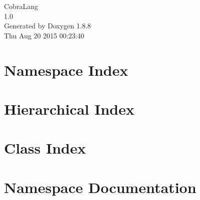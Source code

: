 \documentclass[twoside]{book}
\newcommand{\+}{\discretionary{\mbox{\scriptsize$\hookleftarrow$}}{}{}}
\newcommand{\clearemptydoublepage}{%
  \newpage{\pagestyle{empty}\cleardoublepage}%
}
\begin{document}
\hypersetup{pageanchor=false,
             bookmarks=true,
             bookmarksnumbered=true,
             pdfencoding=unicode
            }
\begin{titlepage}
\vspace*{7cm}
\begin{center}%
{\Large Cobra\+Lang \\[1ex]\large 1.\+0 }\\
\vspace*{1cm}
{\large Generated by Doxygen 1.8.8}\\
\vspace*{0.5cm}
{\small Thu Aug 20 2015 00:23:40}\\
\end{center}
\end{titlepage}
\clearemptydoublepage
\tableofcontents
\clearemptydoublepage
{}
\hypersetup{pageanchor=true}

\chapter{Namespace Index}

\chapter{Hierarchical Index}

\chapter{Class Index}

\chapter{Namespace Documentation}

\end{document}
